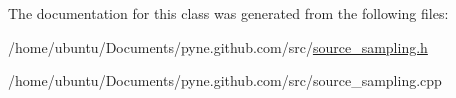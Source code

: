 The documentation for this class was generated from the following files\+:\begin{DoxyCompactItemize}
\item 
/home/ubuntu/\+Documents/pyne.\+github.\+com/src/\hyperlink{source__sampling_8h}{source\+\_\+sampling.\+h}\item 
/home/ubuntu/\+Documents/pyne.\+github.\+com/src/source\+\_\+sampling.\+cpp\end{DoxyCompactItemize}

